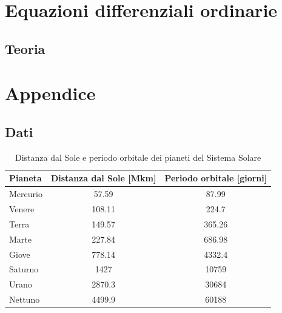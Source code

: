 \documentclass[letterpaper, 12pt]{article}
\begin{document}
\section{Equazioni differenziali ordinarie}
\subsection{Teoria}

\section{Appendice}
\subsection{Dati}

\begin{table}[!ht]
    \centering
    \caption{Distanza dal Sole e periodo orbitale dei pianeti del Sistema Solare}
    \label{tab:pianeti}
        \begin{tabular}{|l|c|c|}
        \hline
        \textbf{Pianeta} & \textbf{Distanza dal Sole [Mkm]} & \textbf{Periodo orbitale [giorni]} \\
        \hline
        Mercurio & 57.59   & 87.99   \\
        Venere   & 108.11  & 224.7   \\
        Terra    & 149.57  & 365.26  \\
        Marte    & 227.84  & 686.98  \\
        Giove    & 778.14  & 4332.4  \\
        Saturno  & 1427    & 10759   \\
        Urano    & 2870.3  & 30684   \\
        Nettuno  & 4499.9  & 60188   \\
        \hline
        \end{tabular}
\end{table}
\end{document}
